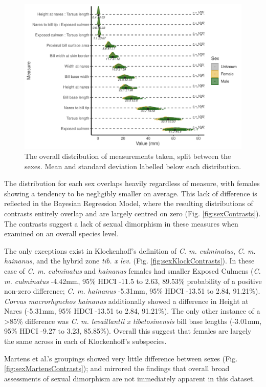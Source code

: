 \documentclass[10pt,a4paper]{article}
\begin{document}
\begin{figure}
\includegraphics[width=0.9\linewidth]{../Figures/OverallSummaryPlot} \caption{The overall distribution of measurements taken, split between the sexes. Mean and standard deviation labelled below each distribution.}\label{fig:overallPlot}
\end{figure}

The distribution for each sex overlaps heavily regardless of measure, with females showing a tendency to be negligibly smaller on average.
This lack of difference is reflected in the Bayesian Regression Model, where the resulting distributions of contrasts entirely overlap and are largely centred on zero (Fig. \ref{fig:sexContrasts}).
The contrasts suggest a lack of sexual dimorphism in these measures when examined on an overall species level.

The only exceptions exist in Klockenhoff's definition of \emph{C. m. culminatus}, \emph{C. m. hainanus}, and the hybrid zone \emph{tib. x lev.} (Fig. \ref{fig:sexKlockContrasts}).
In these case of \emph{C. m. culminatus} and \emph{hainanus} females had smaller Exposed Culmens (\emph{C. m. culminatus} -4.42mm, 95\% HDCI -11.5 to 2.63, 89.53\% probability of a positive non-zero difference; \emph{C. m. hainanus} -5.31mm, 95\% HDCI -13.51 to 2.84, 91.21\%).
\emph{Corvus macrorhynchos hainanus} additionally showed a difference in Height at Nares (-5.31mm, 95\% HDCI -13.51 to 2.84, 91.21\%).
The only other instance of a \textgreater85\% difference was \emph{C. m. levaillantii x tibetosinensis} bill base lengths (-3.01mm, 95\% HDCI -9.27 to 3.23, 85.85\%).
Overall this suggest that females are largely the same across in each of Klockenhoff's subspecies.

Martens et al.'s groupings showed very little difference between sexes (Fig. \ref{fig:sexMartensContrasts}); and mirrored the findings that overall broad assessments of sexual dimorphism are not immediately apparent in this dataset.
\end{document}

